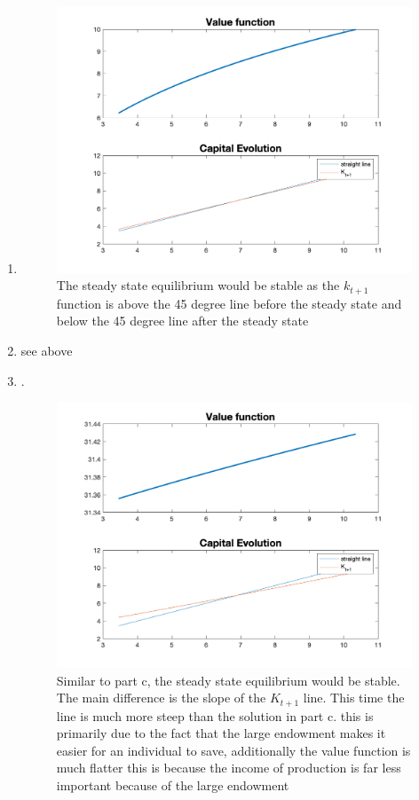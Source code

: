 \begin{enumerate}
   \item 
   \begin{figure}[H]
       \centering
       \includegraphics[width = .5\linewidth]{HW3/pics/HW3_Q2_figure.png}
       \caption{The steady state equilibrium would be stable as the $k_{t+1}$ function is above the 45 degree line before the steady state and below the 45 degree line after the steady state}
       \label{fig:HW3_2c}
   \end{figure}
   \item see above
   \item .
   \begin{figure}[H]
       \centering
       \includegraphics[width = .5\linewidth]{HW3/pics/HW3_Q2_e_figure.png}
       \caption{Similar to part c, the steady state equilibrium would be stable. The main difference is the slope of the $K_{t+1}$ line. This time the line is much more steep than the solution in part c. this is primarily due to the fact that the large endowment makes it easier for an individual to save, additionally the value function is much flatter this is because the income of production is far less important because of the large endowment}
       \label{fig:HW3_2e}
   \end{figure}
\end{enumerate}